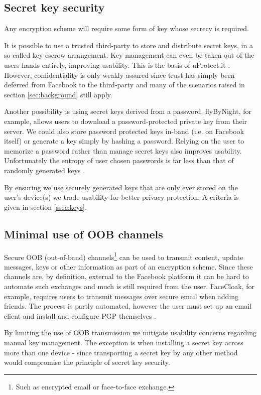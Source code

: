 \FloatBarrier
\subsection{Secret key security}

Any encryption scheme will require some form of key whose secrecy is required.

It is possible to use a trusted third-party to store and distribute secret keys, in a so-called key escrow arrangement. Key management can even be taken out of the users hands entirely, improving usability. This is the basis of uProtect.it \cite{uprotect}. However, confidentiality is only weakly assured since trust has simply been deferred from Facebook to the third-party and many of the scenarios raised in section \ref{sec:background} still apply.

Another possibility is using secret keys derived from a password. flyByNight, for example, allows users to download a password-protected private key from their server. We could also store password protected keys in-band (i.e. on Facebook itself) or generate a key simply by hashing a password. Relying on the user to memorize a password rather than manage secret keys also improves usability. Unfortunately the entropy of user chosen passwords is far less than that of randomly generated keys \cite{passwords}.

By ensuring we use securely generated keys that are only ever stored on the user's device(s) we trade usability for better privacy protection. A criteria is given in section \ref{ssec:keys}.


\FloatBarrier
\subsection{Minimal use of OOB channels}

Secure OOB (out-of-band) channels\footnote{Such as encrypted email or face-to-face exchange.} can be used to transmit content, update messages, keys or other information as part of an encryption scheme. Since these channels are, by definition, external to the Facebook platform it can be hard to automate such exchanges and much is still required from the user. FaceCloak, for example, requires users to transmit messages over secure email when adding friends. The process is partly automated, however the user must set up an email client and install and configure PGP themselves \cite{facecloak}.

By limiting the use of OOB transmission we mitigate usability concerns regarding manual key management. The exception is when installing a secret key across more than one device - since transporting a secret key by any other method would compromise the principle of secret key security.


